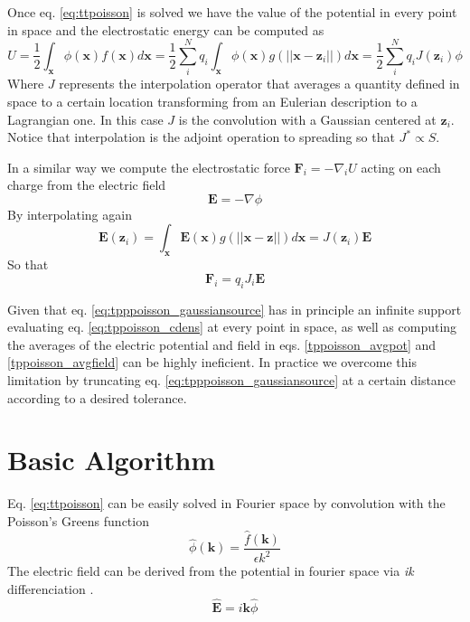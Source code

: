 \documentclass[ twoside,openright,titlepage,numbers=noenddot,%
headinclude,footinclude,cleardoublepage=empty,abstract=on,
BCOR=5mm,paper=a4,fontsize=11pt
]{scrreprt}
\renewcommand{\vec}[1]{\bm{#1}}
\begin{document}
Once eq. \eqref{eq:ttpoisson} is solved we have the value of the potential in every point in space and the electrostatic energy can be computed as
\begin{equation}
  \label{tppoisson_avgpot}
  U = \frac{1}{2}\int_{\vec{x}}{ \phi(\vec{x}) f(\vec{x}) d\vec{x}} = \frac{1}{2}\sum_i^N{q_i\int_{\vec{x}}\phi(\vec{x})g(||\vec{x}-\vec{z}_i||) d\vec{x}} = \frac{1}{2}\sum_i^N{q_iJ(\vec{z}_i)\phi}
\end{equation}
Where $J$ represents the interpolation operator that averages a quantity defined in space to a certain location transforming from an Eulerian description to a Lagrangian one. In this case $J$ is the convolution with a Gaussian centered at $\vec{z}_i$. Notice that interpolation is the adjoint operation to spreading so that $J^{*} \propto S$.

In a similar way we compute the electrostatic force $\vec{F}_i = -\nabla_i{U}$ acting on each charge from the electric field
\begin{equation}
  \vec{E} = -\nabla{\phi} 
\end{equation}
By interpolating again
\begin{equation}
  \label{tppoisson_avgfield}
\vec{E}(\vec{z}_i) = \int_{\vec{x}}{\vec{E}(\vec{x})g(||\vec{x}-\vec{z}||)d\vec{x}} = J(\vec{z}_i)\vec{E} %
\end{equation}
So that
\begin{equation}
\vec{F}_i = q_iJ_i\vec{E}%
\end{equation}

Given that eq. \eqref{eq:tpppoisson_gaussiansource} has in principle an infinite support evaluating eq. \eqref{eq:tppoisson_cdens} at every point in space, as well as computing the averages of the electric potential and field in eqs. \eqref{tppoisson_avgpot} and \eqref{tppoisson_avgfield} can be highly ineficient. In practice we overcome this limitation by truncating eq. \eqref{eq:tpppoisson_gaussiansource} at a certain distance according to a desired tolerance.
\section{Basic Algorithm}
Eq. \eqref{eq:ttpoisson} can be easily solved in Fourier space by convolution with the Poisson's Greens function 
\begin{equation}
  \label{tppoisson_phihat}
 \hat\phi(\vec{k}) = \frac{\hat f(\vec{k})}{\epsilon k^2}
\end{equation}   
The electric field can be derived from the potential in fourier space via \emph{ik} differenciation \cite{ikdiff}.
\begin{equation}
  \hat{\vec{E}} = i\vec{k}\hat{\phi}
\end{equation}
\end{document}
